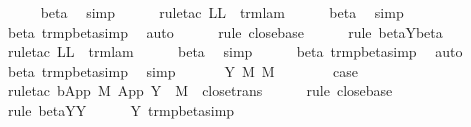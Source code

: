 \begin{isabellebody}
\ \ \ \ \isamarkupfalse%
\ beta\ \isamarkupfalse%
\ simp\isanewline
\ \ \ \ \isamarkupfalse%
\ {\isacharparenleft}rule{\isacharunderscore}tac\ L{\isacharequal}L\ \ trm{\isachardot}lam{\isacharparenright}\isanewline
\ \ \ \ \isamarkupfalse%
\ beta\ \isamarkupfalse%
\ simp\isanewline
\ \ \ \ \isamarkupfalse%
\ beta{\isacharparenleft}{}{\isacharparenright}\ trm{\isacharunderscore}pbeta{\isacharunderscore}simp{}\ \isamarkupfalse%
\ auto{\isacharbrackleft}{}{\isacharbrackright}\isanewline
\ \ \ \ \isamarkupfalse%
\ {\isacharparenleft}rule\ close{\isachardot}base{\isacharparenright}\isanewline
\ \ \ \ \isamarkupfalse%
\ {\isacharparenleft}rule\ beta{\isacharunderscore}Y{\isachardot}beta{\isacharparenright}\isanewline
\ \ \ \ \isamarkupfalse%
\ {\isacharparenleft}rule{\isacharunderscore}tac\ L{\isacharequal}L\ \ trm{\isachardot}lam{\isacharparenright}\isanewline
\ \ \ \ \isamarkupfalse%
\ beta\ \isamarkupfalse%
\ simp\isanewline
\ \ \ \ \isamarkupfalse%
\ beta{\isacharparenleft}{}{\isacharparenright}\ trm{\isacharunderscore}pbeta{\isacharunderscore}simp{}\ \isamarkupfalse%
\ auto{\isacharbrackleft}{}{\isacharbrackright}\isanewline
\ \ \ \ \isamarkupfalse%
\ beta\ trm{\isacharunderscore}pbeta{\isacharunderscore}simp{}\ \isamarkupfalse%
\ simp\isanewline
\ \ \isamarkupfalse%
\isanewline
\ \ \isamarkupfalse%
\ {\isacharparenleft}Y\ M\ M{\isacharprime}\ {\isasymsigma}{\isacharparenright}\ \isanewline
\ \ \ \ \isamarkupfalse%
\ {\isacharquery}case\isanewline
\ \ \ \ \isamarkupfalse%
\ {\isacharparenleft}rule{\isacharunderscore}tac\ b{\isacharequal}{\isachardoublequoteopen}App\ M\ {\isacharparenleft}App\ {\isacharparenleft}Y\ {\isasymsigma}{\isacharparenright}\ M{\isacharparenright}{\isachardoublequoteclose}\ \ close{\isachardot}trans{\isacharparenright}\isanewline
\ \ \ \ \isamarkupfalse%
\ {\isacharparenleft}rule\ close{\isachardot}base{\isacharparenright}\isanewline
\ \ \ \ \isamarkupfalse%
\ {\isacharparenleft}rule\ beta{\isacharunderscore}Y{\isachardot}Y{\isacharparenright}\isanewline
\ \ \ \ \isamarkupfalse%
\ Y\ trm{\isacharunderscore}pbeta{\isacharunderscore}simp{}\ \isamarkupfalse%

\end{isabellebody}
